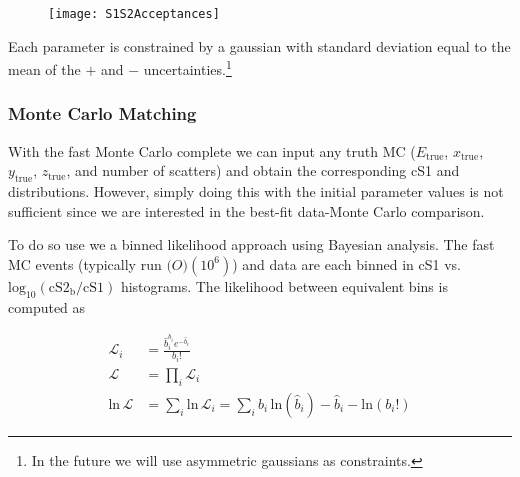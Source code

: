 \begin{figure}
\centering
\texttt{[image: S1S2Acceptances]}
\label{fig:er_nr_calibrations_parameter_determ_cuts_acceptances}
\end{figure}

Each parameter is
constrained by a gaussian with standard deviation equal to the mean of the $+$ and $-$ uncertainties.\footnote{In the future we will use
asymmetric gaussians as constraints.}



\subsubsection{Monte Carlo Matching}
\label{subsubsec:er_nr_calibrations_parameter_determ_mc_match}
With the fast Monte Carlo complete we can input any truth MC ($E_{\mathrm{true}}$, $x_{\mathrm{true}}$, $y_{\mathrm{true}}$,
$z_{\mathrm{true}}$, and number of scatters) and obtain the corresponding cS1 and \cstwob distributions.  However, simply doing this with
the initial parameter values is not sufficient since we are interested in the best-fit data-Monte Carlo comparison.

To do so use we a binned likelihood approach using Bayesian analysis.  The fast MC events (typically run $\mathcal(O)(10^6)$) and data are
each binned in cS1 vs. $\mathrm{log_{10}(cS2_b / cS1)}$ histograms.  The likelihood between equivalent bins \li is computed as

\begin{equation}
\begin{aligned}
\mathcal{L}_i &=\frac{\hat{b}_{i}^{b_i} e^{-\hat{b}_{i}}}{b_{i}!} \\
\mathcal{L} &= \prod_i \mathcal{L}_i \\
\mathrm{ln}\, \mathcal{L} &= \sum_i \mathrm{ln}\, \mathcal{L}_i = \sum_i b_i\, \mathrm{ln} (\hat{b}_i) - \hat{b}_i - \mathrm{ln} (b_i !)
\end{aligned}
\end{equation}

